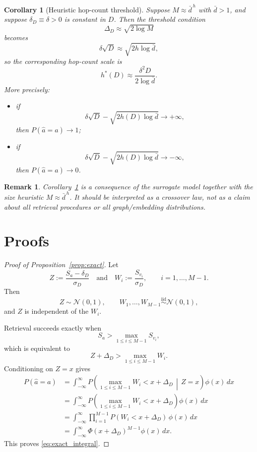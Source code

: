 \documentclass[11pt]{article}
\newtheorem{corollary}[theorem]{Corollary}
\newtheorem{remark}{Remark}
\begin{document}
\begin{corollary}[Heuristic hop-count threshold]\label{cor:hstar}
Suppose $M \approx \bar d^{\,h}$ with $\bar d>1$, and suppose $\delta_D \equiv \delta > 0$ is constant in $D$. Then the threshold condition
\[
\Delta_D \approx \sqrt{2\log M}
\]
becomes
\[
\delta\sqrt{D} \approx \sqrt{2h\log\bar d},
\]
so the corresponding hop-count scale is
\begin{equation}\label{eq:hstar}
h^*(D) \approx \frac{\delta^2 D}{2\log\bar d}.
\end{equation}
More precisely:
\begin{itemize}
    \item if
    \[
    \delta\sqrt{D} - \sqrt{2h(D)\log\bar d}\to +\infty,
    \]
    then $P(\hat a=a)\to 1$;

    \item if
    \[
    \delta\sqrt{D} - \sqrt{2h(D)\log\bar d}\to -\infty,
    \]
    then $P(\hat a=a)\to 0$.
\end{itemize}
\end{corollary}

\begin{remark}
Corollary~\ref{cor:hstar} is a consequence of the surrogate model together with the size heuristic $M\approx \bar d^{\,h}$. It should be interpreted as a crossover law, not as a claim about all retrieval procedures or all graph/embedding distributions.
\end{remark}

\section{Proofs}

\begin{proof}[Proof of Proposition~\ref{prop:exact}]
Let
\[
Z := \frac{S_a - \delta_D}{\sigma_D}
\quad\text{and}\quad
W_i := \frac{S_{v_i}}{\sigma_D},
\qquad i=1,\dots,M-1.
\]
Then
\[
Z\sim \mathcal N(0,1),
\qquad
W_1,\dots,W_{M-1}\stackrel{\mathrm{iid}}{\sim}\mathcal N(0,1),
\]
and $Z$ is independent of the $W_i$.

Retrieval succeeds exactly when
\[
S_a > \max_{1\le i\le M-1} S_{v_i},
\]
which is equivalent to
\[
Z + \Delta_D > \max_{1\le i\le M-1} W_i.
\]
Conditioning on $Z=x$ gives
\begin{align*}
P(\hat a=a)
&=
\int_{-\infty}^{\infty}
P\!\left(\max_{1\le i\le M-1} W_i < x+\Delta_D \,\middle|\, Z=x\right)\phi(x)\,dx \\
&=
\int_{-\infty}^{\infty}
P\!\left(\max_{1\le i\le M-1} W_i < x+\Delta_D\right)\phi(x)\,dx \\
&=
\int_{-\infty}^{\infty}
\prod_{i=1}^{M-1} P(W_i < x+\Delta_D)\,\phi(x)\,dx \\
&=
\int_{-\infty}^{\infty}
\Phi(x+\Delta_D)^{M-1}\phi(x)\,dx.
\end{align*}
This proves \eqref{eq:exact_integral}.
\end{proof}
\end{document}
